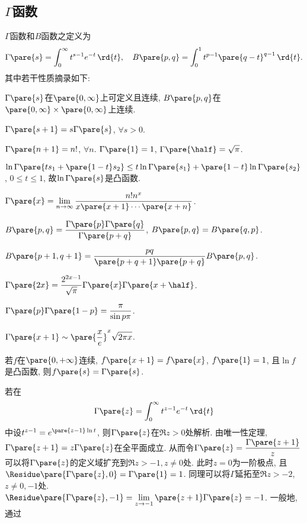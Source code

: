 \documentclass[../ComplexVariable.tex]{subfiles}
\begin{document}

\subsection{\texorpdfstring{$\Gamma$}{Gamma}函数} %
\label{sub:gamma函数}

$\Gamma$函数和$B$函数之定义为
\[ \Gamma\pare{s} = \int_0^\infty t^{s-1} e^{-t}\,\rd{t},\quad B\pare{p,q} = \int_0^1 t^{p-1} \pare{q-t}^{q-1}\,\rd{t}. \]
其中若干性质摘录如下:
\begin{cenum}
    \item $\Gamma\pare{s}$在$\pare{0,\infty}$上可定义且连续, $B\pare{p,q}$在$\pare{0,\infty}\times \pare{0,\infty}$上连续.
    \item $\Gamma\pare{s+1} = s\Gamma\pare{s}$, $\forall s>0$.
    \item $\Gamma\pare{n+1} = n!$, $\forall n$. $\Gamma\pare{1} = 1$, $\displaystyle \Gamma\pare{\half} = \sqrt{\pi}$.
    \item $\ln \Gamma\pare{ts_1 + \pare{1-t}s_2} \le t\ln \Gamma\pare{s_1} + \pare{1-t} \ln \Gamma\pare{s_2}$, $0\le t\le 1$, 故$\ln \Gamma\pare{s}$是凸函数.
    \item $\displaystyle \Gamma\pare{x} = \lim_{n\rightarrow\infty} \frac{n!n^x}{x\pare{x+1}\cdots \pare{x+n}}$.
    \item $\displaystyle B\pare{p,q} = \frac{\Gamma\pare{p}\Gamma\pare{q}}{\Gamma\pare{p+q}}$, $\displaystyle B\pare{p,q} = B\pare{q,p}$.
    \item $\displaystyle B\pare{p+1,q+1} = \frac{pq}{\pare{p+q+1}\pare{p+q}}B\pare{p,q}$.
    \item $\displaystyle \Gamma\pare{2x} = \frac{2^{2x-1}}{\sqrt{\pi}} \Gamma\pare{x} \Gamma\pare{x+\half}$.
    \item $\displaystyle \Gamma\pare{p} \Gamma\pare{1-p} = \frac{\pi}{\sin p\pi}$.
    \item $\displaystyle \Gamma\pare{x+1} \sim \displaystyle \pare{\frac{x}{e}}^x \sqrt{2\pi x}$.
\end{cenum}
\begin{remark}
    若$f$在$\pare{0,+\infty}$连续, $f\pare{x+1} = f\pare{x}$, $f\pare{1} = 1$, 且$\ln f$是凸函数, 则$f\pare{s} = \Gamma\pare{s}$.
\end{remark}
若在
\[ \Gamma\pare{z} = \int_0^\infty t^{z-1}e^{-t}\,\rd{t} \]
中设$t^{z-1} = e^{\pare{z-1}\ln t}$, 则$\Gamma\pare{z}$在$\Re z>0$处解析. 由唯一性定理, $\Gamma\pare{z+1} = z\Gamma\pare{z}$在全平面成立. 从而令$\displaystyle \Gamma\pare{z} = \frac{\Gamma\pare{z+1}}{z}$可以将$\Gamma\pare{z}$的定义域扩充到$\Re z>-1, z\neq 0$处. 此时$z=0$为一阶极点, 且$\Residue\pare{\Gamma\pare{z},0} = \Gamma\pare{1} = 1$. 同理可以将$\Gamma$延拓至$\Re z>-2$, $z\neq 0, -1$处. $\Residue \pare{\Gamma\pare{z},-1} = \displaystyle \lim_{z\rightarrow -1} \pare{z+1}\Gamma\pare{z} = -1$. 一般地, 通过
\end{document}
